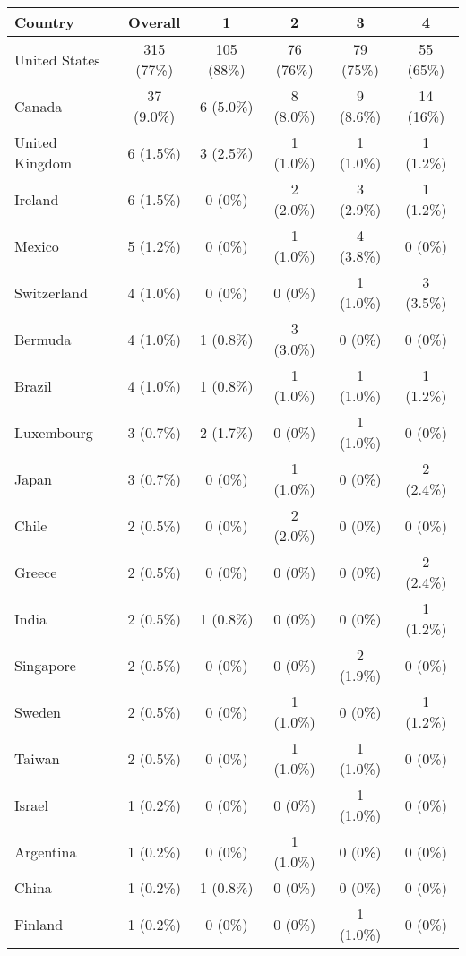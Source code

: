 \documentclass[12pt]{article}
\begin{document}
\begin{table}
    \centering

        \begin{tabular}{lccccc}
        \toprule
        Country & Overall & 1 & 2 & 3 & 4 \\
        \midrule
        United States & 315 (77\%) & 105 (88\%) & 76 (76\%) & 79 (75\%) & 55 (65\%)\\
        Canada & 37 (9.0\%) & 6 (5.0\%) & 8 (8.0\%) & 9 (8.6\%) & 14 (16\%)\\
        United Kingdom & 6 (1.5\%) & 3 (2.5\%) & 1 (1.0\%) & 1 (1.0\%) & 1 (1.2\%)\\
        Ireland & 6 (1.5\%) & 0 (0\%) & 2 (2.0\%) & 3 (2.9\%) & 1 (1.2\%)\\
        Mexico & 5 (1.2\%) & 0 (0\%) & 1 (1.0\%) & 4 (3.8\%) & 0 (0\%)\\
        Switzerland & 4 (1.0\%) & 0 (0\%) & 0 (0\%) & 1 (1.0\%) & 3 (3.5\%)\\
        Bermuda & 4 (1.0\%) & 1 (0.8\%) & 3 (3.0\%) & 0 (0\%) & 0 (0\%)\\
        Brazil & 4 (1.0\%) & 1 (0.8\%) & 1 (1.0\%) & 1 (1.0\%) & 1 (1.2\%)\\
        Luxembourg & 3 (0.7\%) & 2 (1.7\%) & 0 (0\%) & 1 (1.0\%) & 0 (0\%)\\
        Japan & 3 (0.7\%) & 0 (0\%) & 1 (1.0\%) & 0 (0\%) & 2 (2.4\%)\\
        Chile & 2 (0.5\%) & 0 (0\%) & 2 (2.0\%) & 0 (0\%) & 0 (0\%)\\
        Greece & 2 (0.5\%) & 0 (0\%) & 0 (0\%) & 0 (0\%) & 2 (2.4\%)\\
        India & 2 (0.5\%) & 1 (0.8\%) & 0 (0\%) & 0 (0\%) & 1 (1.2\%)\\
        Singapore & 2 (0.5\%) & 0 (0\%) & 0 (0\%) & 2 (1.9\%) & 0 (0\%)\\
        Sweden & 2 (0.5\%) & 0 (0\%) & 1 (1.0\%) & 0 (0\%) & 1 (1.2\%)\\
        Taiwan & 2 (0.5\%) & 0 (0\%) & 1 (1.0\%) & 1 (1.0\%) & 0 (0\%)\\
        Israel & 1 (0.2\%) & 0 (0\%) & 0 (0\%) & 1 (1.0\%) & 0 (0\%)\\
        Argentina & 1 (0.2\%) & 0 (0\%) & 1 (1.0\%) & 0 (0\%) & 0 (0\%)\\
        China & 1 (0.2\%) & 1 (0.8\%) & 0 (0\%) & 0 (0\%) & 0 (0\%)\\
        Finland & 1 (0.2\%) & 0 (0\%) & 0 (0\%) & 1 (1.0\%) & 0 (0\%)\\

\end{tabular}
\end{table}
\end{document}
